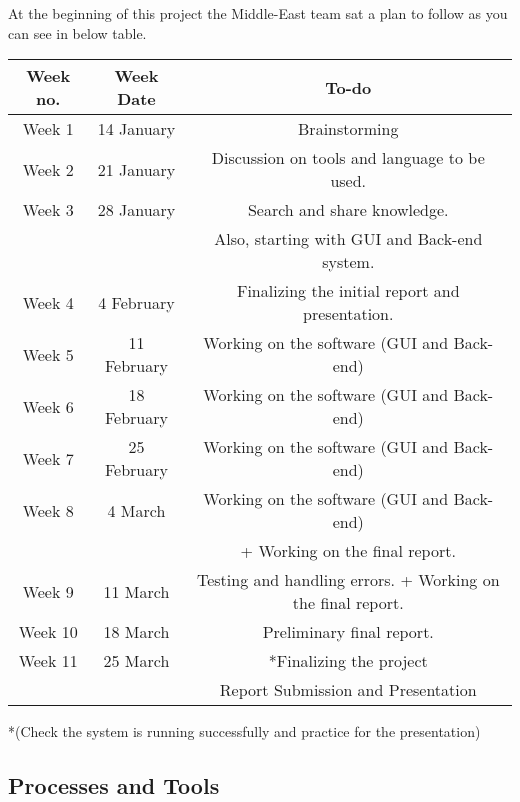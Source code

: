 \documentclass{article}
\begin{document}
At the beginning of this project the Middle-East team sat a plan to follow as you can see in below table. 
\newline
\begin{center}
\begin{tabular}{|c|c|c|} 

\hline
\textbf{Week no.} & \textbf{Week Date } & \textbf{To-do } \\ 
\hline
Week 1 & 14 January  & Brainstorming \\ 
\hline
Week 2 & 21 January  & Discussion  on tools and language to be used. \\ 
\hline

Week 3 & 28 January & Search and share knowledge. \\
 & & Also, starting with GUI and Back-end system. 
 \\ 
\hline
Week 4 & 4 February & Finalizing the initial report and presentation.  \\ 
\hline
Week 5 &  11 February & Working on the software (GUI and Back-end)  \\
\hline
Week 6 & 18  February & Working on the software (GUI and Back-end)   \\ 
\hline
Week 7 & 25  February & Working on the software (GUI and Back-end)   \\ 
\hline
Week 8 & 4 March  & Working on the software (GUI and Back-end)   \\  
 & & + Working on the final report. \\   
\hline
Week 9 & 11 March  & Testing and handling errors. + Working on the final report.   \\ 
\hline
Week 10 & 18 March  & Preliminary final report. \\ 
\hline
Week 11 & 25 March  & *Finalizing the project  \\ 
 &  & Report Submission and Presentation  \\

\hline

\end{tabular}
\end{center}
    



*(Check the system is running successfully and practice for the presentation) 
 


\subsection{Processes and Tools}
\end{document}
